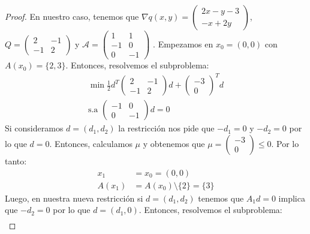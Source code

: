 \documentclass{article}
\begin{document}
\begin{proof}
    En nuestro caso, tenemos que \( \nabla q(x, y) = \begin{pmatrix}
        2x - y - 3 \\
        -x + 2y
    \end{pmatrix} \), \( Q = \begin{pmatrix}
        2  & -1 \\
        -1 & 2
    \end{pmatrix} \) y \( \mathcal{A} = \begin{pmatrix}
        1  & 1  \\
        -1 & 0  \\
        0  & -1
    \end{pmatrix} \) . Empezamos en \( x_0 = (0,0) \) con \( A(x_0) = \{ 2, 3 \} \). Entonces, resolvemos el subproblema:\begin{align*}
        \min \frac{1}{2} d^T \begin{pmatrix}
                                 2  & -1 \\
                                 -1 & 2
                             \end{pmatrix} d + \begin{pmatrix}
                                                   -3 \\
                                                   0
                                               \end{pmatrix}^T d \\
        \text{s.a } \begin{pmatrix}
                        -1 & 0  \\
                        0  & -1
                    \end{pmatrix} d = 0
    \end{align*}
    Si consideramos \( d = (d_1, d_2) \) la restricción nos pide que \( -d_1 = 0 \) y \( -d_2 = 0 \) por lo que \( d = 0 \). Entonces, calculamos \( \mu \) y obtenemos que \( \mu = \begin{pmatrix}
        -3 \\
        0
    \end{pmatrix} \leq 0 \). Por lo tanto: \begin{align*}
        x_1    & = x_0 = (0,0)                        \\
        A(x_1) & = A(x_0) \setminus \{ 2 \} = \{ 3 \}
    \end{align*}
    Luego, en nuestra nueva restricción si \( d = (d_1, d_2) \) tenemos que \( A_1 d = 0 \) implica que \( -d_2 = 0 \) por lo que \( d = (d_1, 0) \). Entonces, resolvemos el subproblema:\begin{align*}

\end{align*}
\end{proof}
\end{document}
